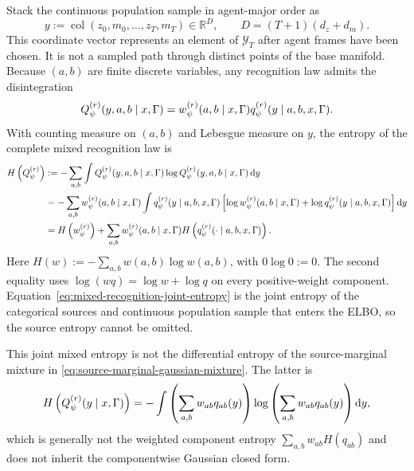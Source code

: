 Stack the continuous population sample in agent-major order as
\begin{equation}
y:=\operatorname{col}(z_0,m_0,\ldots,z_T,m_T)
\in\mathbb R^D,
\qquad
D=(T+1)(d_z+d_m).
\label{eq:stacked-continuous-path}
\end{equation}
This coordinate vector represents an element of $\mathcal Y_T$ after agent frames have been chosen. It is not a sampled path through distinct points of the base manifold.
Because $(a,b)$ are finite discrete variables, any recognition law admits the disintegration
\begin{equation}
Q_\psi^{(r)}(y,a,b\mid x,\Gamma)
=w_\psi^{(r)}(a,b\mid x,\Gamma)
q_\psi^{(r)}(y\mid a,b,x,\Gamma).
\label{eq:recognition-disintegration}
\end{equation}
With counting measure on $(a,b)$ and Lebesgue measure on $y$, the entropy of the complete mixed recognition law is
\begin{equation}
\begin{aligned}
H\left(Q_\psi^{(r)}\right)
&:=-\sum_{a,b}\int
Q_\psi^{(r)}(y,a,b\mid x,\Gamma)
\log Q_\psi^{(r)}(y,a,b\mid x,\Gamma)
\mathop{\mathrm dy}\\
&=-\sum_{a,b}w_\psi^{(r)}(a,b\mid x,\Gamma)
\int q_\psi^{(r)}(y\mid a,b,x,\Gamma)
\left[
\log w_\psi^{(r)}(a,b\mid x,\Gamma)
+\log q_\psi^{(r)}(y\mid a,b,x,\Gamma)
\right]
\mathop{\mathrm dy}\\
&=H\left(w_\psi^{(r)}\right)
+\sum_{a,b}w_\psi^{(r)}(a,b\mid x,\Gamma)
H\left(q_\psi^{(r)}(\mathord{\cdot}\mid a,b,x,\Gamma)\right).
\end{aligned}
\label{eq:mixed-recognition-joint-entropy}
\end{equation}
Here $H(w):=-\sum_{a,b}w(a,b)\log w(a,b)$, with $0\log0:=0$. The second equality uses $\log(wq)=\log w+\log q$ on every positive-weight component. Equation~\eqref{eq:mixed-recognition-joint-entropy} is the joint entropy of the categorical sources and continuous population sample that enters the ELBO, so the source entropy cannot be omitted.

This joint mixed entropy is not the differential entropy of the source-marginal mixture in \cref{eq:source-marginal-gaussian-mixture}.  The latter is
\begin{equation}
H\left(Q_\psi^{(r)}(y\mid x,\Gamma)\right)
=-\int
\left(\sum_{a,b}w_{ab}q_{ab}(y)\right)
\log\left(\sum_{a,b}w_{ab}q_{ab}(y)\right)
\mathop{\mathrm dy},
\label{eq:source-marginal-mixture-entropy}
\end{equation}
which is generally not the weighted component entropy $\sum_{a,b}w_{ab}H(q_{ab})$ and does not inherit the componentwise Gaussian closed form.


